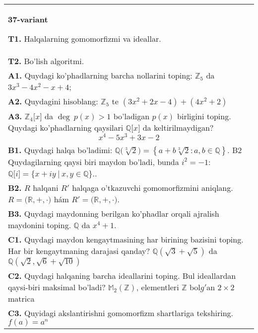 \documentclass{article}
\begin{document}
\begin{tabular}{m{17cm}}
\textbf{37-variant}
\newline

\textbf{T1.} Halqalarning gomomorfizmi va ideallar. \\
\textbf{T2.} Bo'lish algoritmi. \\
\textbf{A1.} Quydagi ko'phadlarning barcha nollarini toping:
\(\mathbb{Z}_{5}\) da \(3x^{3} - 4x^{2} - x + 4\); \\
\textbf{A2.} Quydagini hisoblang:
\(\mathbb{Z}_{5}\) te \(\left( 3x^{2} + 2x - 4 \right) + \left( 4x^{2} + 2 \right)\) \\
\textbf{A3.} \(\mathbb{Z}_{4}\lbrack x\rbrack\) da \(\deg\ p(x) > 1\) bo'ladigan \(p(x)\) birligini toping. Quydagi ko'phadlarning qaysilari \(\mathbb{Q\lbrack}x\rbrack\) da keltirilmaydigan?
\[x^{4} - 5x^{3} + 3x - 2\] \\
\textbf{B1.} Quydagi halqa bo'ladimi:
\(\mathbb{Q(}\sqrt[3]{2}) = \left\{ a + b\sqrt[3]{2}:a,b \in \mathbb{Q} \right\}\).
B2 Quydagilarning qaysi biri maydon bo'ladi, bunda \(i^{2} = - 1\):
\(\mathbb{Q\lbrack}i\rbrack = \{ x + iy\ |\ x,y \in \mathbb{Q\}}\).. \\
\textbf{B2.} \(R\) halqani \(R'\) halqaga o'tkazuvchi gomomorfizmini aniqlang.
\(R\mathbb{= (R,} + , \cdot )\) hám \(R'\mathbb{= (R,} + , \cdot )\). \\
\textbf{B3.} Quydagi maydonning berilgan ko'phadlar orqali ajralish maydonini toping.
\(\mathbb{Q}\) da \(x^{4} + 1\). \\
\textbf{C1.} Quydagi maydon kengaytmasining har birining bazisini toping. Har bir kengaytmaning darajasi qanday?
\(\mathbb{Q}\left( \sqrt{3} + \sqrt{5} \right)\) da \(\mathbb{Q}\left( \sqrt{2},\sqrt{6} + \sqrt{10} \right)\) \\
\textbf{C2.} Quydagi halqaning barcha ideallarini toping. Bul ideallardan qaysi-biri maksimal bo'ladi?
\(\mathbb{M}_{2}\left( \mathbb{Z} \right)\), elementleri \(\mathbb{Z}\) bol\(g'\)an \(2 \times 2\) matrica \\
\textbf{C3.} Quyidagi akslantirishni gomomorfizm shartlariga tekshiring. \(f(a) = a^{n}\) \\

\end{tabular}
\vspace{1cm}
\end{document}
